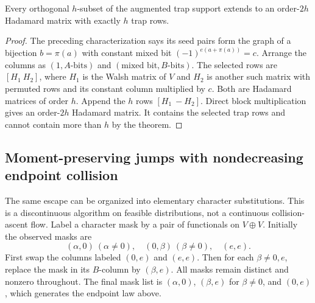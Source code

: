 \begin{proposition}
\label{s15:prop:compression-complete-clique}
Every orthogonal $h$-subset of the augmented trap support extends to an
order-$2h$ Hadamard matrix with exactly $h$ trap rows.
\end{proposition}
\begin{proof}
The preceding characterization says its seed pairs form the graph of a
bijection $b=\pi(a)$ with constant mixed bit $(-1)^{e(a+\pi(a))}=c$.
Arrange the columns as $(1,A\text{-bits})$ and
$(\text{mixed bit},B\text{-bits})$. The selected rows are
$[H_1\ H_2]$, where $H_1$ is the Walsh matrix of $V$ and $H_2$ is
another such matrix with permuted rows and its constant column multiplied
by $c$. Both are Hadamard matrices of order $h$. Append the $h$ rows
$[H_1\ -H_2]$. Direct block multiplication gives an order-$2h$ Hadamard
matrix. It contains the selected trap rows and cannot contain more than
$h$ by the theorem.
\end{proof}

\subsection{Moment-preserving jumps with nondecreasing endpoint collision}
The same escape can be organized into elementary character substitutions.
This is a discontinuous algorithm on feasible distributions, not a
continuous collision-ascent flow. Label a character mask by a pair of
functionals on $V\oplus V$. Initially the observed masks are
\[
 (\alpha,0)\ (\alpha\ne0),\quad (0,\beta)\ (\beta\ne0),\quad(e,e).
\]
First swap the columns labeled $(0,e)$ and $(e,e)$. Then for each
$\beta\ne0,e$, replace the mask in its $B$-column by $(\beta,e)$.
All masks remain distinct and nonzero throughout. The final mask list is
$(\alpha,0)$, $(\beta,e)$ for $\beta\ne0$, and $(0,e)$, which generates
the endpoint law above.

